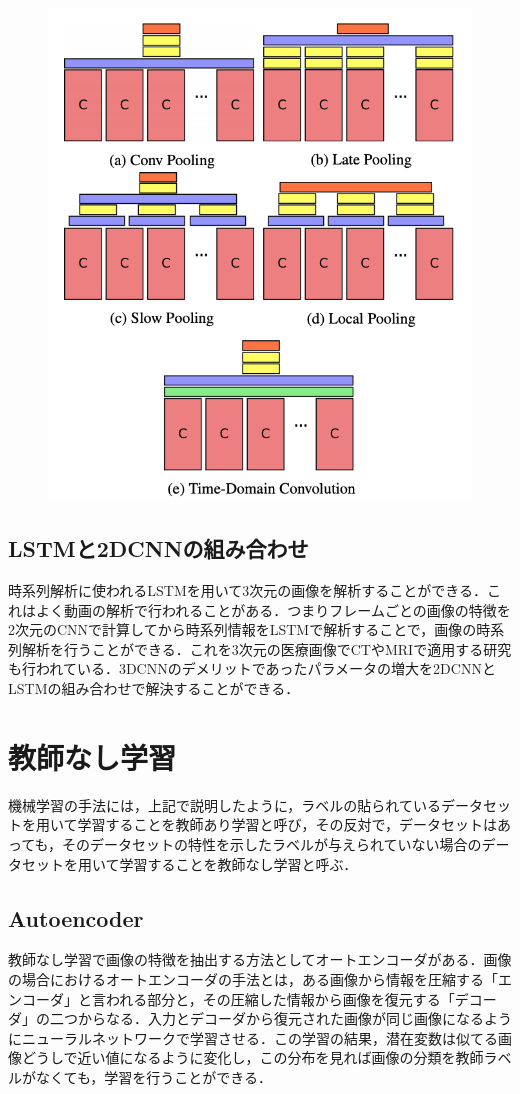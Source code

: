 \begin{figure}[h]
\centering
\includegraphics[width=0.7\linewidth]{fig/stacked_conv.png}
\caption{}
\label{fig:}
\end{figure}

\subsection{LSTMと2DCNNの組み合わせ}
時系列解析に使われるLSTMを用いて3次元の画像を解析することができる．これはよく動画の解析で行われることがある．つまりフレームごとの画像の特徴を2次元のCNNで計算してから時系列情報をLSTMで解析することで，画像の時系列解析を行うことができる．これを3次元の医療画像でCTやMRIで適用する研究も行われている．3DCNNのデメリットであったパラメータの増大を2DCNNとLSTMの組み合わせで解決することができる．

\section{教師なし学習}
機械学習の手法には，上記で説明したように，ラベルの貼られているデータセットを用いて学習することを教師あり学習と呼び，その反対で，データセットはあっても，そのデータセットの特性を示したラベルが与えられていない場合のデータセットを用いて学習することを教師なし学習と呼ぶ．

\subsection{Autoencoder}
教師なし学習で画像の特徴を抽出する方法としてオートエンコーダがある．画像の場合におけるオートエンコーダの手法とは，ある画像から情報を圧縮する「エンコーダ」と言われる部分と，その圧縮した情報から画像を復元する「デコーダ」の二つからなる．入力とデコーダから復元された画像が同じ画像になるようにニューラルネットワークで学習させる．この学習の結果，潜在変数は似てる画像どうしで近い値になるように変化し，この分布を見れば画像の分類を教師ラベルがなくても，学習を行うことができる．

